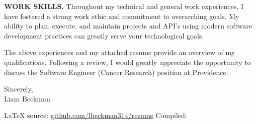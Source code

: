 \textbf{WORK SKILLS.} Throughout my technical and general work experiences, I have fostered a strong work ethic and commitment to overarching goals. My ability to plan, execute, and maintain projects and API's using modern software development practices can greatly serve your technological goals.

\vspace*{\baselineskip}

The above experiences and my attached resume provide an overview of my qualifications. Following a review, I would greatly appreciate the opportunity to discuss the Software Engineer (Cancer Research) position at Providence.

\vspace*{2\baselineskip}

Sincerely,\\

Liam Beckman

\vfill \myBreak{}
\textcolor{my-red}{\LaTeX{} source:} \textcolor{my-blue}{\href{https://github.com/lbeckman314/resume}{github.com/lbeckman314/resume}}
\hfill
\textcolor{my-red}{Compiled:} \textcolor{my-blue}{\href{https://liambeckman.com/jenkins/job/resume/}{\DTMtoday}}


